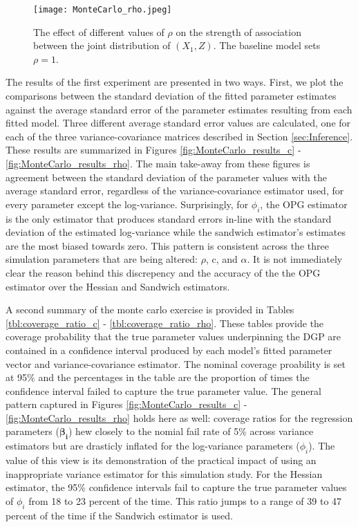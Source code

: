 \documentclass[12pt]{article}
\theoremstyle{definition}
\begin{document}
\begin{figure}[!ht]
    \centering
    \texttt{[image: MonteCarlo\_rho.jpeg]}
    \caption{The effect of different values of $\rho$ on the strength of association between the joint distribution of $(X_{1}, Z)$. The baseline model sets $\rho = 1$.} 
    \label{fig:MC_rho}
\end{figure}

The results of the first experiment are presented in two ways. First, we plot the comparisons between the standard deviation of the fitted parameter estimates against the average standard error of the parameter estimates resulting from each fitted model. Three different average standard error values are calculated, one for each of the three variance-covariance matrices described in Section \ref{sec:Inference}. These results are summarized in Figures \ref{fig:MonteCarlo_results_c} - \ref{fig:MonteCarlo_results_rho}. The main take-away from these figures is agreement between the standard deviation of the parameter values with the average standard error, regardless of the variance-covariance estimator used, for every parameter except the log-variance. Surprisingly, for $\phi_{i}$, the OPG estimator is the only estimator that produces standard errors in-line with the standard deviation of the estimated log-variance while the sandwich estimator's estimates are the most biased towards zero. This pattern is consistent across the three simulation parameters that are being altered: $\rho$, c, and $\alpha$. It is not immediately clear the reason behind this discrepency and the accuracy of the the OPG estimator over the Hessian and Sandwich estimators. 

\bigskip

A second summary of the monte carlo exercise is provided in Tables \ref{tbl:coverage_ratio_c} - \ref{tbl:coverage_ratio_rho}. These tables provide the coverage probability that the true parameter values underpinning the DGP are contained in a confidence interval produced by each model's fitted parameter vector and variance-covariance estimator. The nominal coverage proability is set at 95\% and the percentages in the table are the proportion of times the confidence interval failed to capture the true parameter value. The general pattern captured in Figures \ref{fig:MonteCarlo_results_c} - \ref{fig:MonteCarlo_results_rho} holds here as well: coverage ratios for the regression parameters ($\boldsymbol{\beta_{i}}$) hew closely to the nomial fail rate of 5\% across variance estimators but are drasticly inflated for the log-variance parameters ($\phi_{i}$). The value of this view is its demonstration of the practical impact of using an inappropriate variance estimator for this simulation study. For the Hessian estimator, the 95\% confidence intervals fail to capture the true parameter values of $\phi_{i}$ from 18 to 23 percent of the time. This ratio jumps to a range of 39 to 47 percent of the time if the Sandwich estimator is used. 
\end{document}
